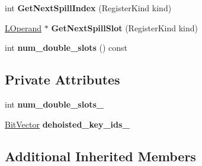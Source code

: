 \begin{DoxyCompactItemize}
\item 
int {\bfseries Get\+Next\+Spill\+Index} (Register\+Kind kind)\hypertarget{classv8_1_1internal_1_1_l_platform_chunk_a5d559c2ce39645c8c7a6746b15b517bf}{}\label{classv8_1_1internal_1_1_l_platform_chunk_a5d559c2ce39645c8c7a6746b15b517bf}

\item 
\hyperlink{classv8_1_1internal_1_1_l_operand}{L\+Operand} $\ast$ {\bfseries Get\+Next\+Spill\+Slot} (Register\+Kind kind)\hypertarget{classv8_1_1internal_1_1_l_platform_chunk_add1d11a5b34e641ee200ab2e05e37480}{}\label{classv8_1_1internal_1_1_l_platform_chunk_add1d11a5b34e641ee200ab2e05e37480}

\item 
int {\bfseries num\+\_\+double\+\_\+slots} () const \hypertarget{classv8_1_1internal_1_1_l_platform_chunk_aaf2cc5db14751c8c3948267e92dcd464}{}\label{classv8_1_1internal_1_1_l_platform_chunk_aaf2cc5db14751c8c3948267e92dcd464}

\end{DoxyCompactItemize}
\subsection*{Private Attributes}
\begin{DoxyCompactItemize}
\item 
int {\bfseries num\+\_\+double\+\_\+slots\+\_\+}\hypertarget{classv8_1_1internal_1_1_l_platform_chunk_ac1aaad8b5942f16bc15f7da8ccf0ea6e}{}\label{classv8_1_1internal_1_1_l_platform_chunk_ac1aaad8b5942f16bc15f7da8ccf0ea6e}

\item 
\hyperlink{classv8_1_1internal_1_1_bit_vector}{Bit\+Vector} {\bfseries dehoisted\+\_\+key\+\_\+ids\+\_\+}\hypertarget{classv8_1_1internal_1_1_l_platform_chunk_a606db30bb95848bea5ba7a81840e7f46}{}\label{classv8_1_1internal_1_1_l_platform_chunk_a606db30bb95848bea5ba7a81840e7f46}

\end{DoxyCompactItemize}
\subsection*{Additional Inherited Members}


